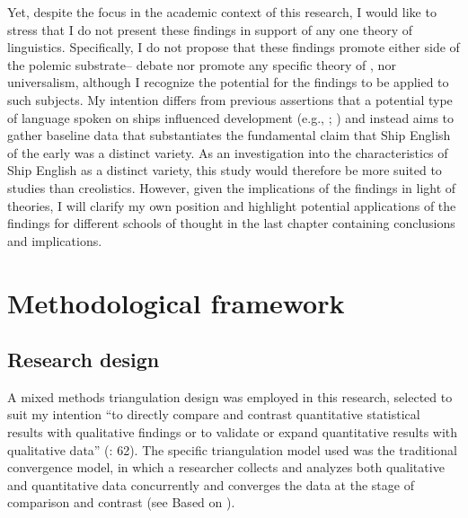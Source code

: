 Yet, despite the  focus in the academic context of this research, I would like to stress that I do not present these findings in support of any one theory of  linguistics. Specifically, I do not propose that these findings promote either side of the polemic substrate– debate nor promote any specific theory of ,  nor universalism, although I recognize the potential for the findings to be applied to such subjects. My intention differs from previous assertions that a potential type of language spoken on ships influenced  development (e.g., \citealt{Reinecke1938}; \citealt{Hancock1972}) and instead aims to gather baseline data that substantiates the fundamental claim that Ship English of the early  was a distinct variety. As an investigation into the characteristics of Ship English as a distinct variety, this study would therefore be more suited to  studies than creolistics. However, given the implications of the findings in light of  theories, I will clarify my own position and highlight potential applications of the findings for different schools of thought in the last chapter containing conclusions and implications. 



\section{{Methodological framework}}\label{sec:1.3}



\subsection{{Research design}}\label{sec:1.3.1}



A mixed methods triangulation design was employed in this research, selected to suit my intention “to directly compare and contrast quantitative statistical results with qualitative findings or to validate or expand quantitative results with qualitative data” (\citealt{CreswellPlanoClark2007}: 62). The specific triangulation model used was the traditional convergence model, in which a researcher collects and analyzes both qualitative and quantitative data concurrently and converges the data at the stage of comparison and contrast (see  Based on \citealt{CreswellPlanoClark2007}).


